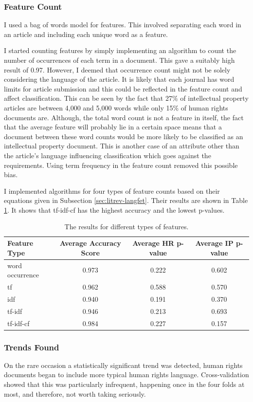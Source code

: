 			\subsubsection{Feature Count}
				I used a bag of words model for features. This involved separating each word in an article and including each unique word as a feature. 
				
				I started counting features by simply implementing an algorithm to count the number of occurrences of each term in a document. This gave a suitably high result of 0.97. However, I deemed that occurrence count might not be solely considering the language of the article. It is likely that each journal has word limits for article submission and this could be reflected in the feature count and affect classification. This can be seen by the fact that 27\% of intellectual property articles are between 4,000 and 5,000 words while only 15\% of human rights documents are. Although, the total word count is not a feature in itself, the fact that the average feature will probably lie in a certain space means that a document between these word counts would be more likely to be classified as an intellectual property document. This is another case of an attribute other than the article's language influencing classification which goes against the requirements. Using term frequency in the feature count removed this possible bias. 
			
				I implemented algorithms for four types of feature counts based on their equations given in Subsection \ref{sec:litrev-langfet}. Their results are shown in Table \ref{tab:featres}. It shows that tf-idf-cf has the highest accuracy and the lowest p-values.
				\begin{table}[h]
					\centering
					\begin{tabular}{l|c|c|c}
						\hline
						Feature Type&Average Accuracy Score&Average HR p-value&Average IP p-value\\
						\hline
						word occurrence&0.973&0.222&0.602\\
						tf&0.962&0.588&0.570\\
						idf&0.940&0.191&0.370\\
						tf-idf&0.946&0.213&0.693\\
						tf-idf-cf&0.984&0.227&0.157
					\end{tabular}
					\caption{The results for different types of features.}\label{tab:featres}
				\end{table}
			\subsubsection{Trends Found}
				On the rare occasion a statistically significant trend was detected, human rights documents began to include more typical human rights language. Cross-validation showed that this was particularly infrequent, happening once in the four folds at most, and therefore, not worth taking seriously.
